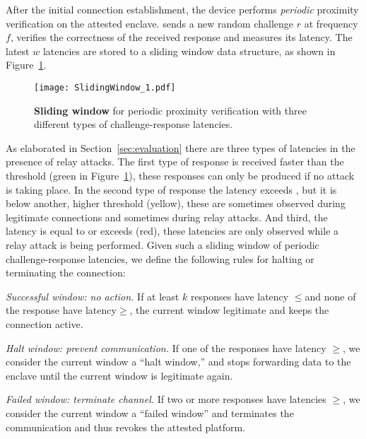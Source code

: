  After the initial connection establishment, the \device device performs \emph{periodic} proximity verification on the attested enclave. \device sends a new random challenge $r$ at frequency $f$, verifies the correctness of the received response and measures its latency. The latest $w$ latencies are stored to a sliding window data structure, as shown in Figure~\ref{fig:slidingWindow}.

\begin{figure}[t]
  \centering
    \texttt{[image: SlidingWindow\_1.pdf]}
    \caption{\textbf{Sliding window} for periodic proximity verification with three different types of challenge-response latencies.}
    \figsaver
    \label{fig:slidingWindow}
\end{figure}

As elaborated in Section~\ref{sec:evaluation} there are three types of latencies in the presence of relay attacks. The first type of response is received faster than the  threshold \connect (green in Figure~\ref{fig:slidingWindow}), these responses can only be produced if no attack is taking place. In the second type of response the latency exceeds \connect, but it is below another, higher threshold \detach (yellow), these are sometimes observed during legitimate connections and sometimes during relay attacks. And third, the latency is equal to or exceeds \detach (red), these latencies are only observed while a relay attack is being performed. Given such a sliding window of periodic challenge-response latencies, we define the following rules for halting or terminating the connection:

\begin{mylist_indent}
  \item \emph{Successful window: no action.} If at least $k$ responses have latency $\leq$\connect and none of the response have latency$\geq$\detach, the current window legitimate and \device keeps the connection active.
 
  \item \emph{Halt window: prevent communication.} If one of the responses have latency $\geq$\detach, we consider the current window a ``halt window,'' and \device stops forwarding data to the enclave until the current window is legitimate again.

  \item \emph{Failed window: terminate channel.} If two or more responses have latencies $\geq$\detach, we consider the current window a ``failed window'' and \device terminates the communication and thus revokes the attested platform.
\end{mylist_indent}




